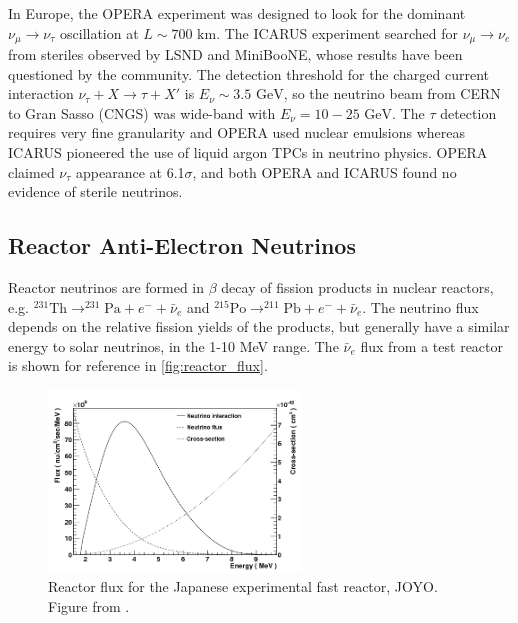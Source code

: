 In Europe, the OPERA\cite{opera} experiment was designed to look for the dominant $\nu_\mu \rightarrow \nu_\tau$ oscillation at $L\sim700\text{ km}$. The ICARUS\cite{icarus} experiment searched for $\nu_\mu\rightarrow\nu_e$ from steriles observed by LSND\cite{lsnd} and MiniBooNE\cite{miniboone_sterile}, whose results have been questioned by the community\cite{lsnd_refute}. The detection threshold for the charged current interaction $\nu_\tau + X \rightarrow \tau + X'$ is $E_\nu\sim 3.5\text{ GeV}$, so the neutrino beam from CERN to Gran Sasso (CNGS)\cite{cngs} was wide-band with $E_\nu = 10-25\text{ GeV}$. The $\tau$ detection requires very fine granularity and OPERA used nuclear emulsions whereas ICARUS pioneered the use of liquid argon TPCs in neutrino physics. OPERA claimed $\nu_\tau$ appearance\cite{opera_final_tau} at 6.1$\sigma$, and both OPERA and ICARUS found no evidence of sterile neutrinos\cite{icarus_lsnd,opera_lsnd}.

\subsection{Reactor Anti-Electron Neutrinos}
Reactor neutrinos are formed in $\beta$ decay of fission products in nuclear reactors, e.g. $^{231}\text{Th} \rightarrow ^{231}\text{Pa} + e^- + \bar{\nu}_e$ and $^{215}\text{Po} \rightarrow ^{211}\text{Pb} + e^- + \bar{\nu}_e$. The neutrino flux depends on the relative fission yields of the products, but generally have a similar energy to solar neutrinos, in the 1-10 MeV range. The $\bar{\nu}_e$ flux from a test reactor is shown for reference in \autoref{fig:reactor_flux}.
\begin{figure}[h]
	\includegraphics[width=0.6\textwidth, trim={0mm 0mm 0mm 0mm}, clip,page=1]{figures/theory/reactor_flux}
	\caption{Reactor flux for the Japanese experimental fast reactor, JOYO. Figure from \cite{reactor_flux}.}
	\label{fig:reactor_flux}
\end{figure}

